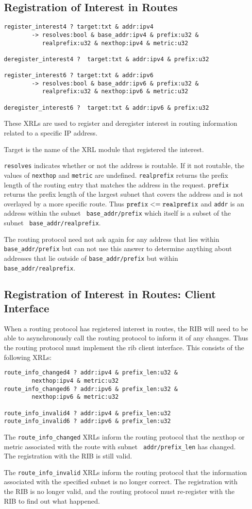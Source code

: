 \documentclass[11pt]{article}
\begin{document}
\subsection{Registration of Interest in Routes}
\label{reg}
\begin{verbatim}
register_interest4 ? target:txt & addr:ipv4 
        -> resolves:bool & base_addr:ipv4 & prefix:u32 & 
           realprefix:u32 & nexthop:ipv4 & metric:u32

deregister_interest4 ?  target:txt & addr:ipv4 & prefix:u32

register_interest6 ? target:txt & addr:ipv6 
        -> resolves:bool & base_addr:ipv6 & prefix:u32 & 
           realprefix:u32 & nexthop:ipv6 & metric:u32

deregister_interest6 ?  target:txt & addr:ipv6 & prefix:u32
\end{verbatim}
These XRLs are used to register and deregister interest in routing
information related to a specific IP address. 

Target is the name of the XRL module that registered the interest.

{\tt resolves} indicates whether or not the address is routable.  If
it not routable, the values of {\tt nexthop} and {\tt metric} are
undefined.  {\tt realprefix} returns the prefix length of the routing
entry that matches the address in the request.  {\tt prefix} returns
the prefix length of the largest subnet that covers the address and is
not overlayed by a more specific route.  Thus ${\tt prefix} <= {\tt
realprefix}$ and {\tt addr} is an address within the subnet {\tt
base\_addr/prefix} which itself is a subset of the subnet {\tt
base\_addr/realprefix}.  

The routing protocol need not ask again for any address that lies
within {\tt base\_addr/prefix} but can not use this answer to determine
anything about addresses that lie outside of {\tt base\_addr/prefix}
but within {\tt base\_addr/realprefix}.

\subsection{Registration of Interest in Routes: Client Interface}
When a routing protocol has registered interest in routes, the RIB
will need to be able to asynchronously call the routing protocol to
inform it of any changes.  Thus the routing protocol must implement
the rib client interface.  This consists of the following XRLs:
\begin{verbatim}
route_info_changed4 ? addr:ipv4 & prefix_len:u32 & 
        nexthop:ipv4 & metric:u32
route_info_changed6 ? addr:ipv6 & prefix_len:u32 & 
        nexthop:ipv6 & metric:u32

route_info_invalid4 ? addr:ipv4 & prefix_len:u32
route_info_invalid6 ? addr:ipv6 & prefix_len:u32
\end{verbatim}
The {\tt route\_info\_changed} XRLs inform the routing protocol that the
nexthop or metric associated with the route with subnet {\tt
addr/prefix\_len} has changed.  The registration with the RIB is still
valid.

The {\tt route\_info\_invalid} XRLs inform the routing protocol that the
information associated with the specified subnet is no longer correct.
The registration with the RIB is no longer valid, and the routing
protocol must re-register with the RIB to find out what happened.
\end{document}
